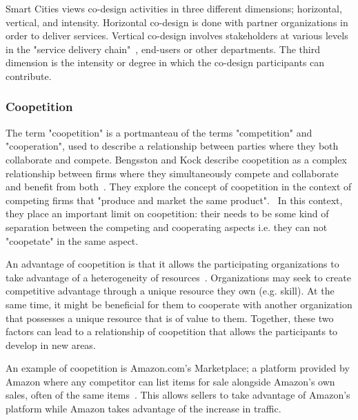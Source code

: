 Smart Cities views co-design activities in three different dimensions; horizontal, vertical, and intensity. Horizontal co-design is done with partner organizations in order to deliver services. Vertical co-design involves stakeholders at various levels in the "service delivery chain"~\cite{Cities}, end-users or other departments. The third dimension is the intensity or degree in which the co-design participants can contribute. 


\subsubsection{Coopetition}

The term "coopetition" is a portmanteau of the terms "competition" and "cooperation", used to describe a relationship between parties where they both collaborate and compete. Bengsston and Kock describe coopetition as a complex relationship between firms where they simultaneously compete and collaborate and benefit from both~\cite{Bengtsson2000}. They explore the concept of coopetition in the context of competing firms that "produce and market the same product".~\cite{Bengtsson2000} In this context, they place an important limit on coopetition: their needs to be some kind of separation between the competing and cooperating aspects i.e. they can not "coopetate" in the same aspect. 

An advantage of coopetition is that it allows the participating organizations to take advantage of a heterogeneity of resources~\cite{Bengtsson2000}. Organizations may seek to create competitive advantage through a unique resource they own (e.g. skill). At the same time, it might be beneficial for them to cooperate with another organization that possesses a unique resource that is of value to them. Together, these two factors can lead to a relationship of coopetition that allows the participants to develop in new areas. 

An example of coopetition is Amazon.com's Marketplace; a platform provided by Amazon where any  competitor can list items for sale alongside Amazon's own sales, often of the same items~\cite{UnknownAskIrina,Amazon.com}. This allows sellers to take advantage of Amazon's platform while Amazon takes advantage of the increase in traffic. 
 


